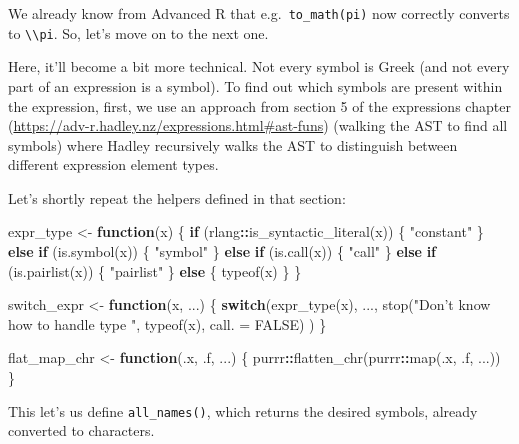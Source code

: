 \documentclass[
]{krantz}
\makeatletter
\newenvironment{Shaded}{\begin{snugshade}}{\end{snugshade}}
\newcommand{\ControlFlowTok}[1]{\textcolor[rgb]{0.13,0.29,0.53}{\textbf{#1}}}
\newcommand{\DataTypeTok}[1]{\textcolor[rgb]{0.13,0.29,0.53}{#1}}
\newcommand{\KeywordTok}[1]{\textcolor[rgb]{0.13,0.29,0.53}{\textbf{#1}}}
\newcommand{\NormalTok}[1]{#1}
\newcommand{\OperatorTok}[1]{\textcolor[rgb]{0.81,0.36,0.00}{\textbf{#1}}}
\newcommand{\OtherTok}[1]{\textcolor[rgb]{0.56,0.35,0.01}{#1}}
\newcommand{\StringTok}[1]{\textcolor[rgb]{0.31,0.60,0.02}{#1}}
\renewcommand{\href}[2]{#2 (\url{#1})}
\newenvironment{kframe}{%
\medskip{}
\setlength{\fboxsep}{.8em}
 \def\at@end@of@kframe{}%
 \ifinner\ifhmode%
  \def\at@end@of@kframe{\end{minipage}}%
  \begin{minipage}{\columnwidth}%
 \fi\fi%
 \def\FrameCommand##1{\hskip\@totalleftmargin \hskip-\fboxsep
 \colorbox{shadecolor}{##1}\hskip-\fboxsep
     \hskip-\linewidth \hskip-\@totalleftmargin \hskip\columnwidth}%
 \MakeFramed {\advance\hsize-\width
   \@totalleftmargin\z@ \linewidth\hsize
   \@setminipage}}%
 {\par\unskip\endMakeFramed%
 \at@end@of@kframe}
\renewenvironment{Shaded}{\begin{kframe}}{\end{kframe}}
\renewcommand{\KeywordTok} [1]{\textcolor[rgb]{0.00,0.44,0.13}{{#1}}}
\renewcommand{\DataTypeTok}[1]{\textcolor[rgb]{0.56,0.13,0.00}{{#1}}}
\renewcommand{\StringTok}  [1]{\textcolor[rgb]{0.25,0.44,0.63}{{#1}}}
\renewcommand{\OtherTok}   [1]{\textcolor[rgb]{0.00,0.44,0.13}{{#1}}}
\renewcommand{\NormalTok}  [1]{{#1}}
\makeatother
\begin{document}
We already know from Advanced R that e.g.~\texttt{to\_math(pi)} now correctly converts to \texttt{\textbackslash{}\textbackslash{}pi}. So, let's move on to the next one.

Here, it'll become a bit more technical. Not every symbol is Greek (and not every part of an expression is a symbol). To find out which symbols are present within the expression, first, we use an approach from \href{https://adv-r.hadley.nz/expressions.html\#ast-funs}{section 5 of the expressions chapter} (walking the AST to find all symbols) where Hadley recursively walks the AST to distinguish between different expression element types.

Let's shortly repeat the helpers defined in that section:

\begin{Shaded}
\begin{Highlighting}[]
\NormalTok{expr_type <-}\StringTok{ }\ControlFlowTok{function}\NormalTok{(x) \{}
  \ControlFlowTok{if}\NormalTok{ (rlang}\OperatorTok{::}\KeywordTok{is_syntactic_literal}\NormalTok{(x)) \{}
    \StringTok{"constant"}
\NormalTok{  \} }\ControlFlowTok{else} \ControlFlowTok{if}\NormalTok{ (}\KeywordTok{is.symbol}\NormalTok{(x)) \{}
    \StringTok{"symbol"}
\NormalTok{  \} }\ControlFlowTok{else} \ControlFlowTok{if}\NormalTok{ (}\KeywordTok{is.call}\NormalTok{(x)) \{}
    \StringTok{"call"}
\NormalTok{  \} }\ControlFlowTok{else} \ControlFlowTok{if}\NormalTok{ (}\KeywordTok{is.pairlist}\NormalTok{(x)) \{}
    \StringTok{"pairlist"}
\NormalTok{  \} }\ControlFlowTok{else}\NormalTok{ \{}
    \KeywordTok{typeof}\NormalTok{(x)}
\NormalTok{  \}}
\NormalTok{\}}

\NormalTok{switch_expr <-}\StringTok{ }\ControlFlowTok{function}\NormalTok{(x, ...) \{}
  \ControlFlowTok{switch}\NormalTok{(}\KeywordTok{expr_type}\NormalTok{(x),}
\NormalTok{         ...,}
         \KeywordTok{stop}\NormalTok{(}\StringTok{"Don't know how to handle type "}\NormalTok{,}
              \KeywordTok{typeof}\NormalTok{(x), }\DataTypeTok{call. =} \OtherTok{FALSE}\NormalTok{)}
\NormalTok{  )}
\NormalTok{\}}

\NormalTok{flat_map_chr <-}\StringTok{ }\ControlFlowTok{function}\NormalTok{(.x, .f, ...) \{}
\NormalTok{  purrr}\OperatorTok{::}\KeywordTok{flatten_chr}\NormalTok{(purrr}\OperatorTok{::}\KeywordTok{map}\NormalTok{(.x, .f, ...))}
\NormalTok{\}}
\end{Highlighting}
\end{Shaded}

This let's us define \texttt{all\_names()}, which returns the desired symbols, already converted to characters.
\end{document}
